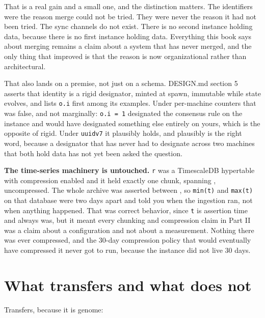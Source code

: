 That is a real gain and a small one, and the distinction matters. The identifiers were the reason merge could not be tried. They were never the reason it had not been tried. The sync channels do not exist. There is no second instance holding data, because there is no first instance holding data. Everything this book says about merging remains a claim about a system that has never merged, and the only thing that improved is that the reason is now organizational rather than architectural.

That also lands on a premise, not just on a schema. DESIGN.md section 5 asserts that identity is a rigid designator, minted at spawn, immutable while state evolves, and lists \texttt{o.i} first among its examples. Under per-machine counters that was false, and not marginally: \texttt{o.i = 1} designated the consensus rule on the \labLineageName{} instance and would have designated something else entirely on yours, which is the opposite of rigid. Under \texttt{uuidv7} it plausibly holds, and plausibly is the right word, because a designator that has never had to designate across two machines that both hold data has not yet been asked the question.

\textbf{The time-series machinery is untouched.} \texttt{r} was a TimescaleDB hypertable with compression enabled and it held exactly one chunk, spanning \labLineageChunkSpan{}, uncompressed. The whole archive was asserted between \labLineageAssertSpan{}, so \texttt{min(t)} and \texttt{max(t)} on that database were two days apart and told you when the ingestion ran, not when anything happened. That was correct behavior, since \texttt{t} is assertion time and always was, but it meant every chunking and compression claim in Part II was a claim about a configuration and not about a measurement. Nothing there was ever compressed, and the 30-day compression policy that would eventually have compressed it never got to run, because the instance did not live 30 days.

\section{What transfers and what does not}

Transfers, because it is genome:

